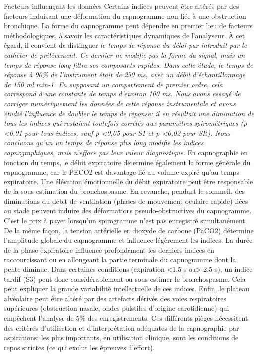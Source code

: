 \documentclass[12pt,]{article}
\begin{document}
Facteurs influençant les données Certains indices peuvent être altérés
par des facteurs induisant une déformation du capnogramme non liée à une
obstruction bronchique. La forme du capnogramme peut dépendre en premier
lieu de facteurs méthodologiques, à savoir les caractéristiques
dynamiques de l'analyseur. À cet égard, il convient de distinguer
\emph{le temps de réponse du délai pur introduit par le cathéter de
prélèvement. Ce dernier ne modifie pas la forme du signal, mais un temps
de réponse long filtre ses composants rapides. Dans cette étude, le
temps de réponse à 90\% de l'instrument était de 250 ms, avec un débit
d'échantillonnage de 150 ml.min-1. En supposant un comportement de
premier ordre, cela correspond à une constante de temps d'environ 100
ms. Nous avons essayé de corriger numériquement les données de cette
réponse instrumentale et avons étudié l'influence de doubler le temps de
réponse: il en résultait une diminution de tous les indices qui
restaient toutefois corrélés aux paramètres spirométriques (p
\textless{}0,01 pour tous indices, sauf p \textless{}0,05 pour S1 et p
\textless{}0,02 pour SR). Nous concluons qu'un un temps de réponse plus
long modifie les indices capnographiques, mais n'efface pas leur valeur
diagnostique}. En capnographie en fonction du temps, le débit
expiratoire détermine également la forme générale du capnogramme, car le
PECO2 est davantage lié au volume expiré qu'au temps expiratoire. Une
élévation émotionnelle du débit expiratoire peut être responsable de la
sous-estimation du bronchospasme. En revanche, pendant le sommeil, des
diminutions du débit de ventilation (phases de mouvement oculaire
rapide) liées au stade peuvent induire des déformations
pseudo-obstructives du capnogramme. C'est le prix à payer lorsqu'un
spirogramme n'est pas enregistré simultanément. De la même façon, la
tension artérielle en dioxyde de carbone (PaCO2) détermine l'amplitude
globale du capnogramme et influence légèrement les indices. La durée de
la phase expiratoire influence profondément les derniers indices en
raccourcissant ou en allongeant la partie terminale du capnogramme dont
la pente diminue. Dans certaines conditions (expiration \textless{}1,5 s
ou\textgreater{} 2,5 s), un indice tardif (S3) peut donc
considérablement ou sous-estimer le bronchospasme. Cela peut expliquer
la grande variabilité intellectuelle de ces indices. Enfin, le plateau
alvéolaire peut être altéré par des artefacts dérivés des voies
respiratoires supérieures (obstruction nasale, ondes pulstiles d'origine
carotidienne) qui empêchent l'analyse de 5\% des enregistrements. Ces
différents pièges nécessitent des critères d'utilisation et
d'interprétation adéquates de la capnographie par aspirations; les plus
importants, en utilisation clinique, sont les conditions de repos
strictes (ce qui exclut les épreuves d'effort).
\end{document}
